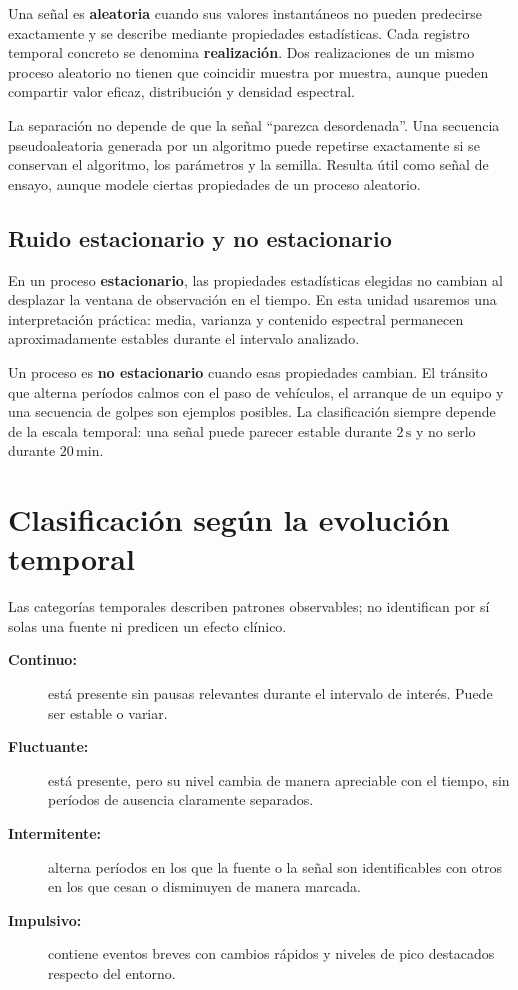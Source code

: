 Una señal es \textbf{aleatoria} cuando sus valores instantáneos no pueden
predecirse exactamente y se describe mediante propiedades estadísticas. Cada
registro temporal concreto se denomina \textbf{realización}. Dos realizaciones
de un mismo proceso aleatorio no tienen que coincidir muestra por muestra,
aunque pueden compartir valor eficaz, distribución y densidad espectral.

La separación no depende de que la señal ``parezca desordenada''. Una secuencia
pseudoaleatoria generada por un algoritmo puede repetirse exactamente si se
conservan el algoritmo, los parámetros y la semilla. Resulta útil como señal de
ensayo, aunque modele ciertas propiedades de un proceso aleatorio.

\subsection{Ruido estacionario y no estacionario}
\label{sec:u10-estacionariedad}

En un proceso \textbf{estacionario}, las propiedades estadísticas elegidas no
cambian al desplazar la ventana de observación en el tiempo. En esta unidad
usaremos una interpretación práctica: media, varianza y contenido espectral
permanecen aproximadamente estables durante el intervalo analizado.

Un proceso es \textbf{no estacionario} cuando esas propiedades cambian. El
tránsito que alterna períodos calmos con el paso de vehículos, el arranque de
un equipo y una secuencia de golpes son ejemplos posibles. La clasificación
siempre depende de la escala temporal: una señal puede parecer estable durante
\(2\,\mathrm{s}\) y no serlo durante \(20\,\mathrm{min}\).

\section{Clasificación según la evolución temporal}
\label{sec:u10-clasificacion-temporal}

Las categorías temporales describen patrones observables; no identifican por
sí solas una fuente ni predicen un efecto clínico.

\begin{description}
    \item[\textbf{Continuo:}] está presente sin pausas relevantes durante el
    intervalo de interés. Puede ser estable o variar.
    \item[\textbf{Fluctuante:}] está presente, pero su nivel cambia de manera
    apreciable con el tiempo, sin períodos de ausencia claramente separados.
    \item[\textbf{Intermitente:}] alterna períodos en los que la fuente o la
    señal son identificables con otros en los que cesan o disminuyen de manera
    marcada.
    \item[\textbf{Impulsivo:}] contiene eventos breves con cambios rápidos y
    niveles de pico destacados respecto del entorno.
\end{description}

